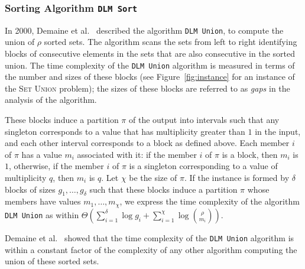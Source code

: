 \subsubsection{Sorting Algorithm \texttt{DLM
    Sort}}
\label{sec:dlm-sort}

In 2000, Demaine et
al.~\cite{2000-SODA-AdaptiveSetIntersectionsUnionsAndDifferences-DemaineLopezOrtizMunro}
described the algorithm \texttt{DLM Union}, to compute
the union of $\rho$ sorted sets.  The algorithm scans the sets from
left to right identifying blocks of consecutive elements in the sets
that are also consecutive in the sorted union. The time complexity of
the \texttt{DLM Union} algorithm is measured in terms of the number
and sizes of these blocks (see Figure~\ref{fig:instance} for an
instance of the \textsc{Set Union} problem); the sizes of these blocks
are referred to as \emph{gaps} in the analysis of the algorithm.
\begin{INUTILE}
  These blocks induce a partition $\pi$ of the output into intervals
  such that any singleton corresponds to a value that has multiplicity
  greater than $1$ in the input, and each other interval corresponds
  to a block as defined above. Each member $i$ of $\pi$ has a value
  $m_i$ associated with it: if the member $i$ of $\pi$ is a block,
  then $m_i$ is $1$, otherwise, if the member $i$ of $\pi$ is a
  singleton corresponding to a value of multiplicity $q$, then $m_i$
  is $q$.
%
  Let $\chi$ be the size of $\pi$.
%
  If the instance is formed by $\delta$ blocks of sizes
  $g_1, \dots, g_{\delta}$ such that these blocks induce a partition
  $\pi$ whose members have values $m_1, \dots, m_{\chi}$, we express
  the time complexity of the algorithm \texttt{DLM Union} as within
  $\Theta(\sum^{\delta}_{i=1}\log g_i +
  \sum^{\chi}_{i=1}\log{\binom{\rho}{m_i}})$.
\end{INUTILE}
%
Demaine et
al.~\cite{2000-SODA-AdaptiveSetIntersectionsUnionsAndDifferences-DemaineLopezOrtizMunro}
showed that the time complexity of the \texttt{DLM Union} algorithm is
within a constant factor of the complexity of any other algorithm
computing the union of these sorted sets.

